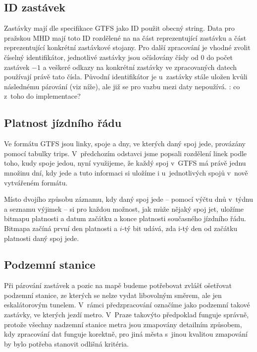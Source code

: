 \subsection{ID zastávek}
Zastávky mají dle specifikace GTFS jako ID použit obecný string. Data pro
pražskou MHD mají toto ID rozdělené na na část reprezentující zastávku a část
reprezentující konkrétní zastávkové stojany. Pro další zpracování je vhodné
zvolit číselný identifikátor, jednotlivé zastávky jsou očíslovány čísly od 0 do
počet zastávek $- 1$ a veškeré odkazy na konkrétní zastávky ve zpracovaných datech
používají právě tato čísla. Původní identifikátor je u~zastávky stále uložen
kvůli následnému párování (viz níže), ale již se pro vazbu mezi daty nepoužívá.
\TODO: co z~toho do implementace?

\subsection{Platnost jízdního řádu}
Ve formátu GTFS jsou linky, spoje a dny, ve kterých daný spoj jede, provázány
pomocí tabulky trips. V~předchozím odstavci jsme popsali rozdělení linek podle
toho, kudy spoje jedou, nyní využijeme, že každý spoj v~GTFS má právě jednu
množinu dní, kdy jede a tuto informaci si uložíme i u~jednotlivých spojů v~nově
vytvářeném formátu.

Místo dvojího způsobu záznamu, kdy daný spoj jede -- pomocí výčtu dnů v~týdnu a
seznamu výjimek -- si pro každou možnost, jak může nějaký spoj jet, uložíme
bitmapu platnosti a datum začátku a konce platnosti současného jízdního řádu. 
Bitmapa začíná první den platnosti a $i$-tý bit udává, zda i-tý den od začátku
platnosti daný spoj jede.  

\subsection{Podzemní stanice}
Při párování zastávek a pozic na mapě budeme potřebovat zvlášť ošetřovat
podzemní stanice, ze kterých se nelze vydat libovolným směrem, ale jen
eskalátorovým tunelem. V~rámci předzpracování označíme jako podzemní takové
zastávky, ve kterých jezdí metro. V~Praze takovýto předpoklad funguje správně,
protože všechny nadzemní stanice metra jsou zmapovány detailním způsobem, kdy
zpracování dat funguje korektně, pro jiná města s~jinou kvalitou zmapování by
bylo potřeba stanovit odlišná kritéria.


